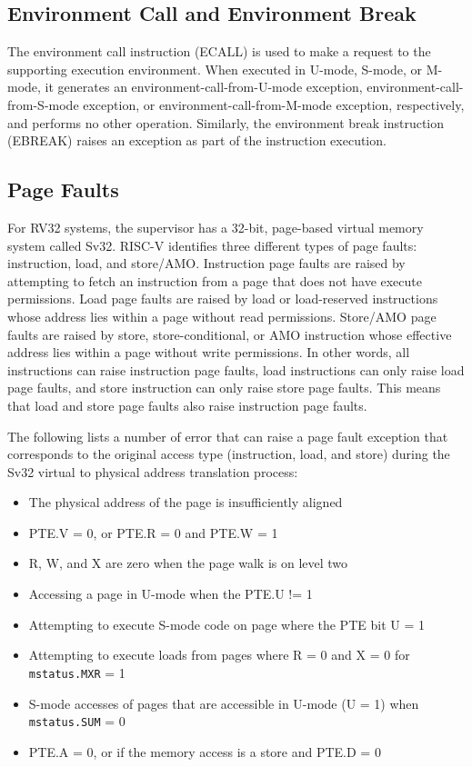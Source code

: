 \documentclass[12pt]{article}
\begin{document}
\subsection{Environment Call and Environment Break}
The environment call instruction (ECALL) is used to make a request to the supporting execution environment. When executed in U-mode, S-mode, or M-mode, it generates an environment-call-from-U-mode exception, environment-call-from-S-mode exception, or environment-call-from-M-mode exception, respectively, and performs no other operation. Similarly, the environment break instruction (EBREAK) raises an exception as part of the instruction execution.

\subsection{Page Faults}
For RV32 systems, the supervisor has a 32-bit, page-based virtual memory system called Sv32. RISC-V identifies three different types of page faults: instruction, load, and store/AMO. Instruction page faults are raised by attempting to fetch an instruction from a page that does not have execute permissions. Load page faults are raised by load or load-reserved instructions whose address lies within a page without read permissions. Store/AMO page faults are raised by store, store-conditional, or AMO instruction whose effective address lies within a page without write permissions. In other words, all instructions can raise instruction page faults, load instructions can only raise load page faults, and store instruction can only raise store page faults. This means that load and store page faults also raise instruction page faults. 

The following lists a number of error that can raise a page fault exception that corresponds to the original access type (instruction, load, and store) during the Sv32 virtual to physical address translation process:
\begin{itemize}
    \item The physical address of the page is insufficiently aligned
    \item PTE.V = 0, or PTE.R = 0 and PTE.W = 1
    \item R, W, and X are zero when the page walk is on level two
    \item Accessing a page in U-mode when the PTE.U != 1
    \item Attempting to execute S-mode code on page where the PTE bit U = 1
    \item Attempting to execute loads from pages where R = 0 and X = 0 for {\tt{mstatus.MXR}} = 1
    \item S-mode accesses of pages that are accessible in U-mode (U = 1) when {\tt{mstatus.SUM}} = 0
    \item PTE.A = 0, or if the memory access is a store and PTE.D = 0
\end{itemize}
\end{document}
